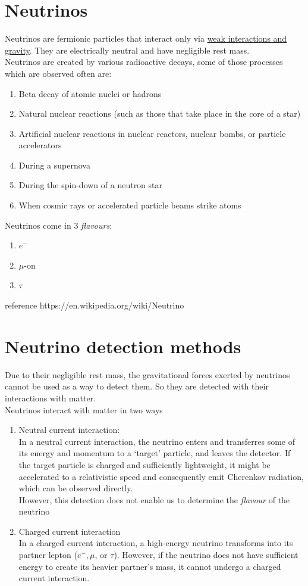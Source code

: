 \documentclass{report}
\begin{document}
\section{\large Neutrinos}
Neutrinos are fermionic particles that interact only via \underline{weak interactions and gravity}.
They are electrically neutral and have negligible rest mass.\\
Neutrinos are created by various radioactive decays, some of those  processes which are observed often are:
\begin{enumerate}
    \item Beta decay of atomic nuclei or hadrons
    \item Natural nuclear reactions (such as those that take place in the core of a star)
    \item Artificial nuclear reactions in nuclear reactors, nuclear bombs, or particle accelerators
    \item During a supernova
    \item During the spin-down of a neutron star
    \item When cosmic rays or accelerated particle beams strike atoms
\end{enumerate}
Neutrinos come in 3 \emph{flavours}:
\begin{enumerate}
    \item $e^- $
    \item $\mu$-on
    \item $\tau$
\end{enumerate}
reference https://en.wikipedia.org/wiki/Neutrino

\section{\large Neutrino detection methods}
Due to their negligible rest mass, the gravitational forces exerted by neutrinos cannot be used as a way to detect them. So they are detected with their interactions with matter.\\
Neutrinos interact with matter in two ways
\begin{enumerate}
    \item Neutral current interaction:\\
    \quad In a neutral current interaction, the neutrino enters and transferres some of its energy and momentum to a ‘target’ particle, and leaves the detector. If the target particle is charged and sufficiently lightweight, it might be accelerated to a relativistic speed and consequently emit Cherenkov radiation, which can be observed directly.\\
    However, this detection does not enable us to determine the \emph{flavour} of the neutrino
    \item Charged current interaction\\
    \quad In a charged current interaction, a high-energy neutrino transforms into its partner lepton ($e^-, \mu$, or $\tau$). However, if the neutrino does not have sufficient energy to create its heavier partner's mass, it cannot undergo a charged current interaction.
\end{enumerate}
\end{document}

